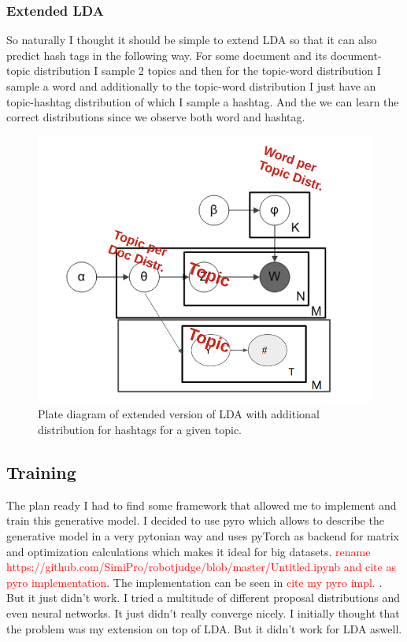 \documentclass[10pt,conference,compsocconf]{IEEEtran}
\newcommand\todo[1]{\textcolor{red}{#1}}
\begin{document}
\subsubsection{Extended LDA}
So naturally I thought it should be simple to extend LDA so that it can also predict hash tags in the following way. For some document and its document-topic distribution I sample 2 topics and then for the topic-word distribution I sample a word and additionally to the topic-word distribution I just have an topic-hashtag distribution of which I sample a hashtag. And the we can learn the correct distributions since we observe both word and hashtag. 
\begin{figure}
	\centering
	\includegraphics[width=0.7\linewidth]{images/extended_lda}
	\caption{Plate diagram of extended version of LDA with additional distribution for hashtags for a given topic. }
	\label{fig:ldaplate}
\end{figure}

\subsection{Training}
The plan ready I had to find some framework that allowed me to implement and train this generative model. I decided to use pyro \cite{bingham2018pyro} which allows to describe the generative model in a very pytonian way and uses pyTorch \cite{paszke2017automatic} as backend for matrix and optimization calculations which makes it ideal for big datasets. \todo{rename https://github.com/SimiPro/robotjudge/blob/master/Untitled.ipynb and cite as pyro implementation}. The implementation can be seen in \todo{cite my pyro impl. }. But it just didn't work. I tried a multitude of different proposal distributions and even neural networks. It just didn't really converge nicely. I initially thought that the problem was my extension on top of LDA. But it didn't work for LDA aswell. 
\end{document}
